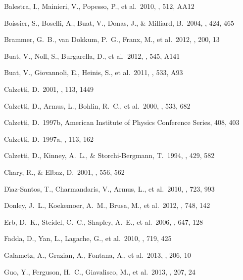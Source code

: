 \documentclass[preprint]{aastex}
\begin{document}
\begin{thebibliography}

 Balestra, I., Mainieri, V., Popesso,
P., et al.\ 2010, \aap, 512, AA12

 Boissier, S., Boselli, A.,
Buat, V., Donas, J., \& Milliard, B.\ 2004, \aap, 424, 465

 Brammer, G.~B., van 
Dokkum, P.~G., Franx, M., et al.\ 2012, \apjs, 200, 13

 Buat, V., Noll, S., Burgarella, D.,
et al.\ 2012, \aap, 545, A141 

 Buat, V., Giovannoli, E., Heinis, S.,
et al.\ 2011, \aap, 533, A93 

 Calzetti, D.\ 2001, \pasp, 113, 1449

 Calzetti, D., Armus, L., Bohlin,
R.~C., et al.\ 2000, \apj, 533, 682

 Calzetti, D.\ 1997b, American 
Institute of Physics Conference Series, 408, 403

 Calzetti, D.\ 1997a, \aj, 113, 162

 Calzetti, D., Kinney, A.~L., \&
Storchi-Bergmann, T.\ 1994, \apj, 429, 582

 Chary, R., \& Elbaz, D.\ 2001, \apj,
556, 562

 D{\'{\i}}az-Santos, T.,
Charmandaris, V., Armus, L., et al.\ 2010, \apj, 723, 993

 Donley, J.~L., Koekemoer, A.~M.,
Brusa, M., et al.\ 2012, \apj, 748, 142

 Erb, D.~K., Steidel, C.~C., 
Shapley, A.~E., et al.\ 2006, \apj, 647, 128

 Fadda, D., Yan, L., 
Lagache, G., et al.\ 2010, \apj, 719, 425

 Galametz, A., Grazian, A.,
Fontana, A., et al.\ 2013, \apjs, 206, 10

 Guo, Y., Ferguson, H.~C., 
Giavalisco, M., et al.\ 2013, \apjs, 207, 24


\end{thebibliography}
\end{document}
